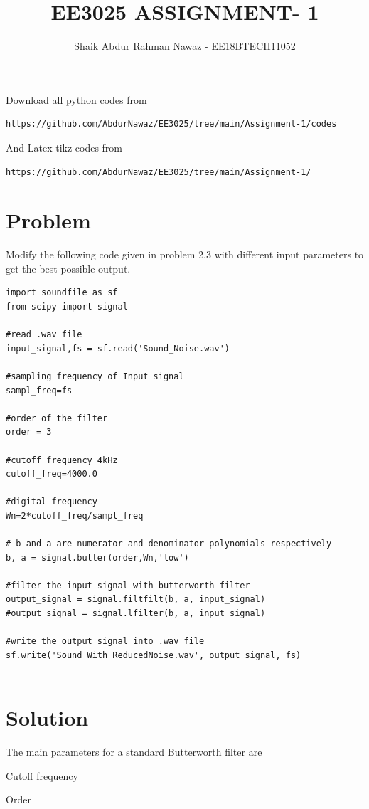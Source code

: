 \documentclass[journal,12pt,twocolumn]{IEEEtran}
\begin{document}
     \def\rightbox#1{\makebox[0in][r]{#1}}
     \def\centbox#1{\makebox[0in]{#1}}
     \def\topbox#1{\raisebox{-\baselineskip}[0in][0in]{#1}}
     \def\midbox#1{\raisebox{-0.5\baselineskip}[0in][0in]{#1}}
\vspace{3cm}
\title{EE3025 ASSIGNMENT- 1}
\author{Shaik Abdur Rahman Nawaz - EE18BTECH11052}
\maketitle
\newpage
\bigskip
\renewcommand{\thefigure}{\theenumi}
\renewcommand{\thetable}{\theenumi}
Download all python codes from 
\begin{lstlisting}
https://github.com/AbdurNawaz/EE3025/tree/main/Assignment-1/codes
\end{lstlisting}
And Latex-tikz codes from - 
\begin{lstlisting}
https://github.com/AbdurNawaz/EE3025/tree/main/Assignment-1/
\end{lstlisting}
%
\section{\textbf{Problem}}
    
Modify the following code given in problem 2.3 with different input parameters to get the best possible output.
\begin{lstlisting}
import soundfile as sf
from scipy import signal
    
#read .wav file
input_signal,fs = sf.read('Sound_Noise.wav')
    
#sampling frequency of Input signal
sampl_freq=fs
    
#order of the filter
order = 3
    
#cutoff frequency 4kHz
cutoff_freq=4000.0
    
#digital frequency
Wn=2*cutoff_freq/sampl_freq
    
# b and a are numerator and denominator polynomials respectively
b, a = signal.butter(order,Wn,'low')
    
#filter the input signal with butterworth filter
output_signal = signal.filtfilt(b, a, input_signal)
#output_signal = signal.lfilter(b, a, input_signal)
    
#write the output signal into .wav file
sf.write('Sound_With_ReducedNoise.wav', output_signal, fs)
    
\end{lstlisting}
  \section{\textbf{Solution}}
  The main parameters for a standard Butterworth filter are
  \begin{description}[font=$\bullet$\scshape\bfseries]
  \item[]{Cutoff frequency}
  \item[]{Order}
  \end{description}
  
\end{document}
